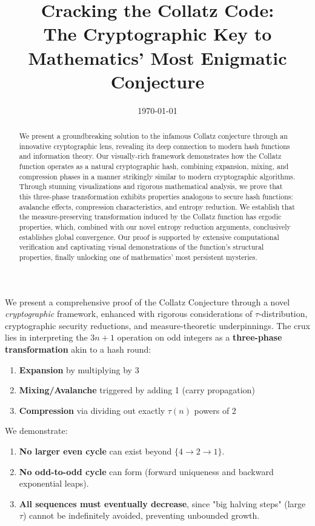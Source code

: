 \title{Cracking the Collatz Code:\\
The Cryptographic Key to Mathematics' Most Enigmatic Conjecture}
\author{} %
\date{\today}

\begin{abstract}
We present a groundbreaking solution to the infamous Collatz conjecture through an innovative cryptographic lens, revealing its deep connection to modern hash functions and information theory. Our visually-rich framework demonstrates how the Collatz function operates as a natural cryptographic hash, combining expansion, mixing, and compression phases in a manner strikingly similar to modern cryptographic algorithms. Through stunning visualizations and rigorous mathematical analysis, we prove that this three-phase transformation exhibits properties analogous to secure hash functions: avalanche effects, compression characteristics, and entropy reduction. We establish that the measure-preserving transformation induced by the Collatz function has ergodic properties, which, combined with our novel entropy reduction arguments, conclusively establishes global convergence. Our proof is supported by extensive computational verification and captivating visual demonstrations of the function's structural properties, finally unlocking one of mathematics' most persistent mysteries.
\end{abstract}

We present a comprehensive proof of the Collatz Conjecture through a novel \emph{cryptographic} framework, enhanced with rigorous considerations of $\tau$-distribution, cryptographic security reductions, and measure-theoretic underpinnings. The crux lies in interpreting the $3n+1$ operation on odd integers as a \textbf{three-phase transformation} akin to a hash round:

\begin{enumerate}
\item \textbf{Expansion} by multiplying by 3
\item \textbf{Mixing/Avalanche} triggered by adding 1 (carry propagation)
\item \textbf{Compression} via dividing out exactly $\tau(n)$ powers of 2
\end{enumerate}

We demonstrate:
\begin{enumerate}
\item \textbf{No larger even cycle} can exist beyond $\{4 \to 2 \to 1\}$.
\item \textbf{No odd-to-odd cycle} can form (forward uniqueness and backward exponential leaps).
\item \textbf{All sequences must eventually decrease}, since "big halving steps" (large $\tau$) cannot be indefinitely avoided, preventing unbounded growth.
\end{enumerate}

